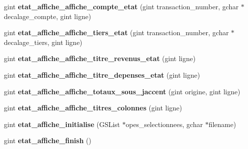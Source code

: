 \begin{DoxyCompactItemize}
\item 
gint {\bf etat\_\-affiche\_\-affiche\_\-compte\_\-etat} (gint transaction\_\-number, gchar $\ast$decalage\_\-compte, gint ligne)
\item 
gint {\bf etat\_\-affiche\_\-affiche\_\-tiers\_\-etat} (gint transaction\_\-number, gchar $\ast$decalage\_\-tiers, gint ligne)
\item 
gint {\bf etat\_\-affiche\_\-affiche\_\-titre\_\-revenus\_\-etat} (gint ligne)
\item 
gint {\bf etat\_\-affiche\_\-affiche\_\-titre\_\-depenses\_\-etat} (gint ligne)
\item 
gint {\bf etat\_\-affiche\_\-affiche\_\-totaux\_\-sous\_\-jaccent} (gint origine, gint ligne)
\item 
gint {\bf etat\_\-affiche\_\-affiche\_\-titres\_\-colonnes} (gint ligne)
\item 
gint {\bf etat\_\-affiche\_\-initialise} (GSList $\ast$opes\_\-selectionnees, gchar $\ast$filename)
\item 
gint {\bf etat\_\-affiche\_\-finish} ()
\end{DoxyCompactItemize}
